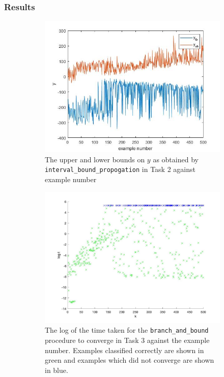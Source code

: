 \documentclass[11pt]{article}
\begin{document}
\subsubsection{Results}
\begin{figure}
    \begin{subfigure}{.5\textwidth}%
        \centering \includegraphics[width=0.8\columnwidth]{Figures/task2.jpg}
        \caption{The upper and lower bounds on $y$ as obtained by \texttt{interval\_bound\_propogation} in Task 2 against example number}
        \label{fig:Task2}
    \end{subfigure}
    \begin{subfigure}{.5\textwidth} 
        \centering \includegraphics[width=0.8\columnwidth]{Figures/Task3.jpg}
        \caption{The log of the time taken for the \texttt{branch\_and\_bound} procedure to converge in Task 3 against the example number. Examples classified correctly are shown in green and examples which did not converge are shown in blue.}
        \label{fig:Task3}
    \end{subfigure}
    \caption{}
\end{figure}
\end{document}
